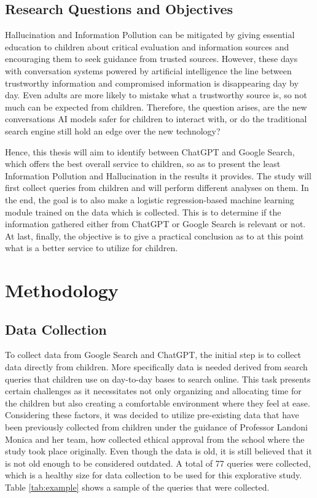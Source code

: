 \documentclass[50pt]{usiinfbachelorproject}
\begin{document}
\subsection{Research Questions and Objectives}
Hallucination and Information Pollution can be mitigated by giving essential education to children about critical evaluation and information sources and encouraging them to seek guidance from trusted sources. However, these days with conversation systems powered by artificial intelligence the line between trustworthy information and compromised information is disappearing day by day. Even adults are more likely to mistake what a trustworthy source is, so not much can be expected from children. Therefore, the question arises, are the new conversations AI models safer for children to interact with, or do the traditional search engine still hold an edge over the new technology?

Hence, this thesis will aim to identify between ChatGPT and Google Search, which offers the best overall service to children, so as to present the least Information Pollution and Hallucination in the results it provides. The study will first collect queries from children and will perform different analyses on them. In the end, the goal is to also make a logistic regression-based machine learning module trained on the data which is collected. This is to determine if the information gathered either from ChatGPT or Google Search is relevant or not. At last, finally, the objective is to give a practical conclusion as to at this point what is a better service to utilize for children. 




\section{Methodology}
\label{sec:methodology}
\subsection{Data Collection}
To collect data from Google Search and ChatGPT, the initial step is to collect data directly from children. More specifically data is needed derived from search queries that children use on day-to-day bases to search online. This task presents certain challenges as it necessitates not only organizing and allocating time for the children but also creating a comfortable environment where they feel at ease. Considering these factors, it was decided to utilize pre-existing data that have been previously collected from children under the guidance of Professor Landoni Monica and her team, how collected ethical approval from the school where the study took place originally. Even though the data is old, it is still believed that it is not old enough to be considered outdated. A total of 77 queries were collected, which is a healthy size for data collection to be used for this explorative study. Table \ref{tab:example} shows a sample of the queries that were collected.
\end{document}
